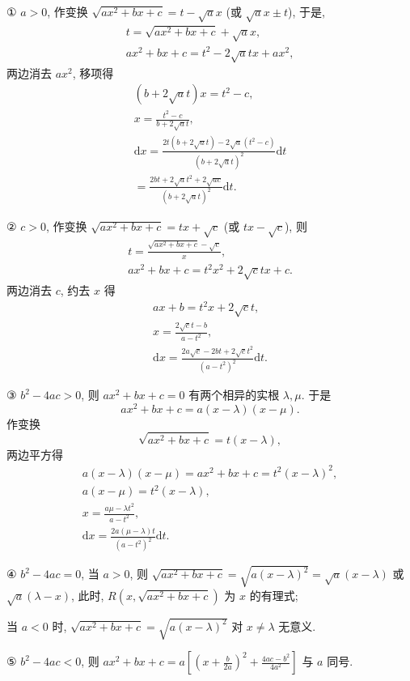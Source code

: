 ① $a>0$, 作变换 $\sqrt{ax^{2}+bx+c}=t-\sqrt{a}x$ (或 $\sqrt{a}x\pm t$), 于是,
\begin{gather*}
t=\sqrt{ax^{2}+bx+c}+\sqrt{a}x,\\
ax^{2}+bx+c=t^{2}-2\sqrt{a}tx+ax^{2},
\end{gather*}
两边消去 $ax^{2}$, 移项得
\begin{gather*}
(b+2\sqrt{a}t)x=t^{2}-c,\\
x=\frac{t^{2}-c}{b+2\sqrt{a}t},\\
\mathrm{d}x=\frac{2t(b+2\sqrt{a}t)-2\sqrt{a}(t^{2}-c)}{(b+2\sqrt{a}t)^{2}}\mathrm{d}t\\
=\frac{2bt+2\sqrt{a}t^{2}+2\sqrt{ac}}{(b+2\sqrt{a}t)^{2}}\mathrm{d}t.
\end{gather*}

② $c>0$, 作变换 $\sqrt{ax^{2}+bx+c}=tx+\sqrt{c}$ (或 $tx-\sqrt{c}$), 则
\begin{gather*}
t=\frac{\sqrt{ax^{2}+bx+c}-\sqrt{c}}{x},\\
ax^{2}+bx+c=t^{2}x^{2}+2\sqrt{c}tx+c.
\end{gather*}
两边消去 $c$, 约去 $x$ 得
\begin{gather*}
ax+b=t^{2}x+2\sqrt{c}t,\\
x=\frac{2\sqrt{c}t-b}{a-t^{2}},\\
\mathrm{d}x=\frac{2a\sqrt{c}-2bt+2\sqrt{c}t^{2}}{(a-t^{2})^{2}}\mathrm{d}t.
\end{gather*}

③ $b^{2}-4ac>0$, 则 $ax^{2}+bx+c=0$ 有两个相异的实根 $\lambda,\mu$. 于是
\[
ax^{2}+bx+c=a(x-\lambda)(x-\mu).
\]
作变换
\[
\sqrt{ax^{2}+bx+c}=t(x-\lambda),
\]
两边平方得
\begin{gather*}
a(x-\lambda)(x-\mu)=ax^{2}+bx+c=t^{2}(x-\lambda)^{2},\\
a(x-\mu)=t^{2}(x-\lambda),\\
x=\frac{a\mu-\lambda t^{2}}{a-t^{2}},\\
\mathrm{d}x=\frac{2a(\mu-\lambda)t}{(a-t^{2})^{2}}\mathrm{d}t.
\end{gather*}

④ $b^{2}-4ac=0$, 当 $a>0$, 则 $\sqrt{ax^{2}+bx+c}=\sqrt{a(x-\lambda)^{2}}=\sqrt{a}(x-\lambda)$ 或 $\sqrt{a}(\lambda-x)$, 此时, $R(x,\sqrt{ax^{2}+bx+c})$ 为 $x$ 的有理式;

当 $a<0$ 时, $\sqrt{ax^{2}+bx+c}=\sqrt{a(x-\lambda)^{2}}$ 对 $x\neq\lambda$ 无意义.

⑤ $b^{2}-4ac<0$, 则 $ax^{2}+bx+c=a\left[\left(x+\frac{b}{2a}\right)^{2}+\frac{4ac-b^{2}}{4a^{2}}\right]$ 与 $a$ 同号.

